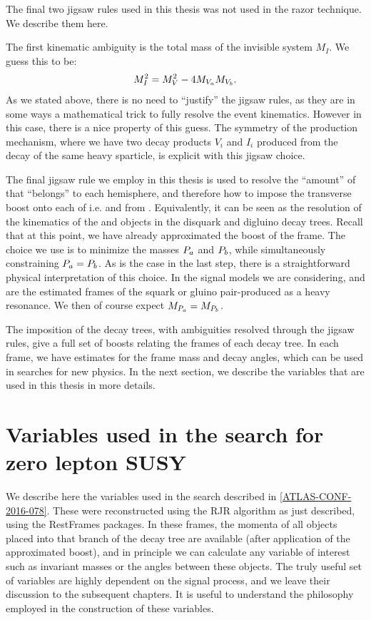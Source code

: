 The final two jigsaw rules used in this thesis was not used in the razor technique.
We describe them here.

The first kinematic ambiguity is the total mass of the invisible system $M_I$.
We guess this to be:
\begin{align}
M_I^2 = M_V^2 - 4 M_{V_a} M_{V_b}.
\end{align}
As we stated above, there is no need to ``justify'' the jigsaw rules, as they are in some ways a mathematical trick to fully resolve the event kinematics.
However in this case, there is a nice property of this guess.
The symmetry of the production mechanism, where we have two decay products $V_i$ and $I_i$ produced from the decay of the same heavy sparticle, is explicit with this jigsaw choice.

The final jigsaw rule we employ in this thesis is used to resolve the ``amount'' of \met that ``belongs'' to each hemisphere, and therefore how to impose the transverse boost onto each of i.e. \Pa and \Pb from \PP.
Equivalently, it can be seen as the resolution of the kinematics of the \Ia and \Ib objects in the disquark and digluino decay trees.
Recall that at this point, we have already approximated the boost of the \PP frame.
The choice we use is to minimize the masses $P_a$ and $P_b$, while simultaneously constraining $P_a = P_b$.
As is the case in the last step, there is a straightforward physical interpretation of this choice.
In the signal models we are considering, \Pa and \Pb are the estimated frames of the squark or gluino pair-produced as a heavy resonance.
We then of course expect $M_{P_a} = M_{P_b}$.

The imposition of the decay trees, with ambiguities resolved through the jigsaw rules, give a full set of boosts relating the frames of each decay tree.
In each frame, we have estimates for the frame mass and decay angles, which can be used in searches for new physics.
In the next section, we describe the variables that are used in this thesis in more details.

\section{Variables used in the search for zero lepton SUSY}

We describe here the variables used in the search described in \ref{ATLAS-CONF-2016-078}.
These were reconstructed using the RJR algorithm as just described, using the RestFrames packages\cite{RestFrames}.
In these frames, the momenta of all objects placed into that branch of the decay tree are available (after application of the approximated boost), and in principle we can calculate any variable of interest such as invariant masses or the angles between these objects.
The truly useful set of variables are highly dependent on the signal process, and we leave their discussion to the subsequent chapters.
It is useful to understand the philosophy employed in the construction of these variables.

